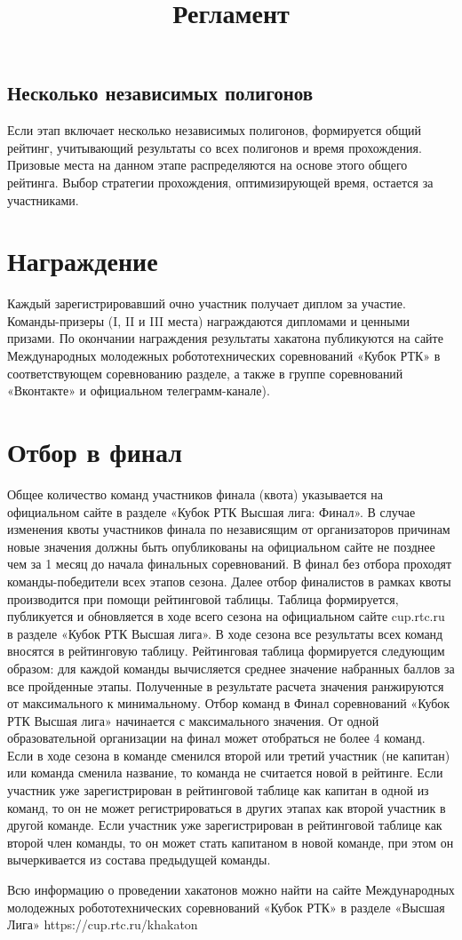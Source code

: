 \documentclass[12pt]{article}
\begin{document}
\subsection{Несколько независимых полигонов} \hspace*{1cm}
Если этап включает несколько независимых полигонов, формируется общий рейтинг, учитывающий результаты со всех полигонов и время прохождения.  Призовые места на данном этапе распределяются на основе этого общего рейтинга.  Выбор стратегии прохождения, оптимизирующей время, остается за участниками.

\section{Награждение} \hspace*{1cm}
Каждый зарегистрировавший очно участник получает диплом за участие. Команды-призеры (I, II и III места) награждаются дипломами и ценными призами. По окончании награждения результаты хакатона публикуются на сайте Международных молодежных робототехнических соревнований «Кубок РТК» в соответствующем соревнованию разделе, а также в группе соревнований «Вконтакте» и официальном телеграмм-канале).

\section{Отбор в финал} \hspace*{1cm}
Общее количество команд участников финала (квота) указывается на официальном сайте в разделе «Кубок РТК Высшая лига: Финал». В случае изменения квоты участников финала по независящим от организаторов причинам новые значения должны быть опубликованы на официальном сайте не позднее чем за 1 месяц до начала финальных соревнований.
В финал без отбора проходят команды-победители всех этапов сезона. Далее отбор финалистов в рамках квоты производится при помощи рейтинговой таблицы. Таблица формируется, публикуется и обновляется в ходе всего сезона на официальном сайте cup.rtc.ru в разделе «Кубок РТК Высшая лига». В ходе сезона все результаты всех команд вносятся в рейтинговую таблицу. Рейтинговая таблица формируется следующим образом: для каждой команды вычисляется среднее значение набранных баллов за все пройденные этапы. Полученные в результате расчета значения ранжируются от максимального к минимальному. Отбор команд в Финал соревнований «Кубок РТК Высшая лига» начинается с максимального значения.
От одной образовательной организации на финал может отобраться не более 
4 команд.
Если в ходе сезона в команде сменился второй или третий участник (не капитан) или команда сменила название, то команда не считается новой в рейтинге. Если участник уже зарегистрирован в рейтинговой таблице как капитан в одной из команд, то он не может регистрироваться в других этапах как второй участник в другой команде. Если участник уже зарегистрирован в рейтинговой таблице как второй член команды, то он может стать капитаном в новой команде, при этом он вычеркивается из состава предыдущей команды.

\newpage
\title{Регламент}
Всю информацию о проведении хакатонов можно найти на сайте Международных молодежных робототехнических соревнований «Кубок РТК» в разделе «Высшая Лига» https://cup.rtc.ru/khakaton
\end{document}
